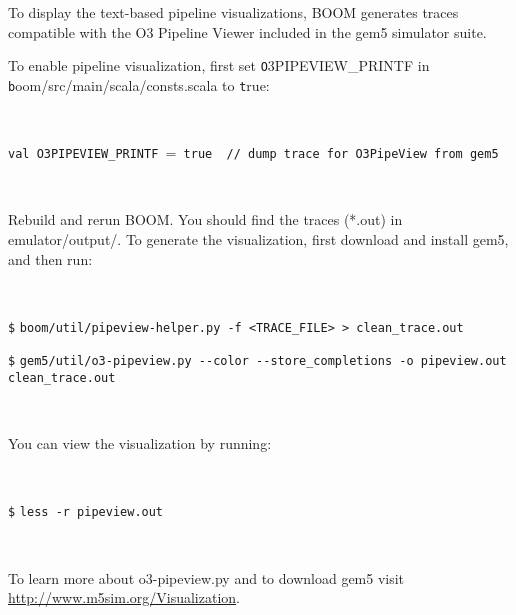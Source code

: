 To display the text-based pipeline visualizations, BOOM generates traces compatible with the O3 Pipeline Viewer included in the gem5 simulator suite.\cite{gem5} 

To enable pipeline visualization, first set {\texttt O3PIPEVIEW\_PRINTF} in {\texttt boom/src/main/scala/consts.scala} to {\texttt true}:

\

\verb=val O3PIPEVIEW_PRINTF ==\verb= true  // dump trace for O3PipeView from gem5=

\

Rebuild and rerun BOOM. You should find the traces (*.out) in emulator/output/. To generate the visualization, first download and install gem5\cite{gem5}, and then run:

\

\texttt{\$} \verb=boom/util/pipeview-helper.py -f <TRACE_FILE> > clean_trace.out=

\texttt{\$} \verb=gem5/util/o3-pipeview.py --color --store_completions -o pipeview.out clean_trace.out=

\

You can view the visualization by running:

\

\texttt{\$} \verb=less -r pipeview.out=

\

To learn more about o3-pipeview.py and to download gem5 visit \url{http://www.m5sim.org/Visualization}.





